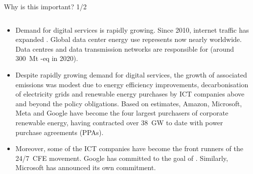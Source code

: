 \begin{frame}{Why is this important? 1/2}

  {\footnotesize

  \begin{columns}[T]
    \begin{column}{9cm}
      \begin{itemize}
        \vspace{-0.1cm}
        \item
        Demand for digital services is rapidly growing. Since 2010, internet traffic has expanded . Global data center energy use represents now nearly  worldwide. 
        Data centres and data transmission networks are responsible for  (around 300~Mt \co-eq in 2020).

        \item Despite rapidly growing demand for digital services, the growth of associated emissions was modest due to energy efficiency improvements, decarbonisation of electricity grids and renewable energy purchases by ICT companies above and beyond the policy obligations. Based on  estimates, Amazon, Microsoft, Meta and Google have become the four largest purchasers of corporate renewable energy, having contracted over 38~GW to date with power purchase agreements (PPAs).
      
        \item Moreover, some of the ICT companies have become the front runners of the 24/7~CFE movement. Google has committed to the goal of . Similarly, Microsoft has announced its own  commitment.

      \end{itemize}
      \end{column}
  

\end{columns}}
\end{frame}
